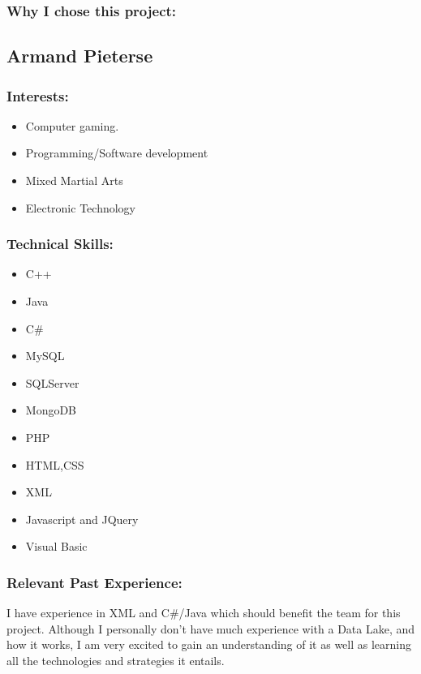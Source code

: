 \subsubsection{Why I chose this project:}

\newpage
\subsection{Armand Pieterse}
	
\subsubsection{Interests:}
	\begin{itemize}
		\item Computer gaming.
		\item Programming/Software development
		\item Mixed Martial Arts
		\item Electronic Technology
	\end{itemize}
		
\subsubsection{Technical Skills:}
	\begin{itemize}
		\item C++
		\item Java
		\item C#
		\item MySQL
		\item SQLServer
		\item MongoDB
		\item PHP
		\item HTML,CSS
		\item XML
		\item Javascript and JQuery
		\item Visual Basic 
	\end{itemize}

\subsubsection{Relevant Past Experience:}
	\par{I have experience in XML and C#/Java which should benefit the team for this project. Although I personally don't have much experience with a Data Lake, and how it works, I am very excited to gain an understanding of it as well as learning all the technologies and strategies it entails.}

